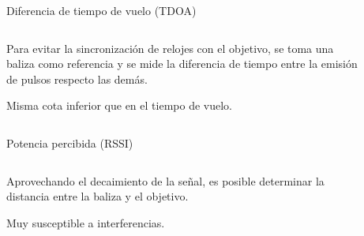 \documentclass{beamer}
\begin{document}
    \begin{frame}{Diferencia de tiempo de vuelo (TDOA)}
      \begin{columns}
        \begin{column}{0.5\textwidth}
          Para evitar la sincronización de relojes con el objetivo, se toma una baliza como referencia y se mide la diferencia de tiempo entre la emisión de pulsos respecto las demás.

          \vspace{0.5cm}
          Misma cota inferior que en el tiempo de vuelo.
        \end{column}
        \begin{column}{0.5\textwidth}  
          \begin{figure}[H]
            \centering
            \def\svgwidth{\linewidth}
            
            \label{fig:TDOA}
        \end{figure}
        \end{column}
        \end{columns}
    \end{frame}

    \begin{frame}{Potencia percibida (RSSI)}
      \begin{columns}
        \begin{column}{0.5\textwidth}
          Aprovechando el decaimiento de la señal, es posible determinar la distancia entre la baliza y el objetivo.

          \vspace{0.5cm}
          Muy susceptible a interferencias.
        \end{column}
        \begin{column}{0.5\textwidth}  
          \begin{figure}[H]
            \centering
            \def\svgwidth{\linewidth}
            
            \label{fig:TOA}
        \end{figure}
        \end{column}
        \end{columns}
    \end{frame}
\end{document}

